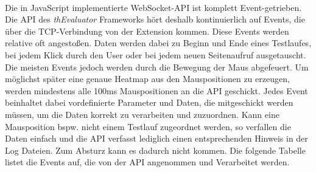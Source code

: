 \\
Die in JavaScript implementierte WebSocket-API ist komplett Event-getrieben. Die API des \textit{thEvaluator} Frameworks hört deshalb kontinuierlich auf Events, die über die TCP-Verbindung von der Extension kommen. Diese Events werden relative oft angestoßen. Daten werden dabei zu Beginn und Ende eines Testlaufes, bei jedem Klick durch den User oder bei jedem neuen Seitenaufruf ausgetauscht. Die meisten Events jedoch werden durch die Bewegung der Maus abgefeuert. Um möglichst später eine genaue Heatmap aus den Mauspositionen zu erzeugen, werden mindestens alle 100ms Mauspositionen an die API geschickt. Jedes Event beinhaltet dabei vordefinierte Parameter und Daten, die mitgeschickt werden müssen, um die Daten korrekt zu verarbeiten und zuzuordnen. Kann eine Mausposition bspw. nicht einem Testlauf zugeordnet werden, so verfallen die Daten einfach und die API verfasst lediglich einen entsprechenden Hinweis in der Log Dateien. Zum Absturz kann es dadurch nicht kommen. Die folgende Tabelle listet die Events auf, die von der API angenommen und Verarbeitet werden.\\
\\
\\
